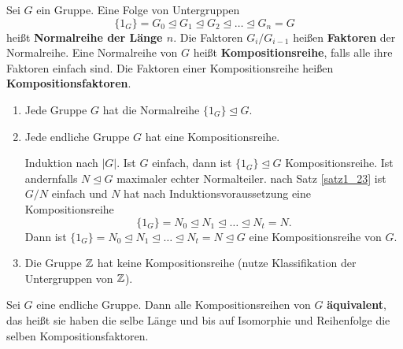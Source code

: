 \begin{definition}
	Sei $G$ ein Gruppe. Eine Folge von Untergruppen
	\[\{1_G\} = G_0 \unlhd G_1 \unlhd G_2 \unlhd \dots \unlhd G_n = G\]
	heißt \textbf{Normalreihe der Länge $n$}. Die Faktoren $G_i/G_{i-1}$ heißen \textbf{Faktoren} der Normalreihe. Eine Normalreihe von $G$ heißt \textbf{Kompositionsreihe}, falls alle ihre Faktoren einfach sind. Die Faktoren einer Kompositionsreihe heißen \textbf{Kompositionsfaktoren}.
\end{definition}
\begin{rem}\label{rem2_15}
	\begin{enumerate}[label=(\roman*)]
		\item Jede Gruppe $G$ hat die Normalreihe $\{1_G\} \unlhd G$.
		\item Jede endliche Gruppe $G$ hat eine Kompositionsreihe.
		
		\begin{inlproof}
			Induktion nach $|G|$. Ist $G$ einfach, dann ist $\{1_G\} \unlhd G$ Kompositionsreihe. Ist andernfalls $N \unlhd G$ maximaler echter Normalteiler. nach Satz \ref{satz1_23} ist $G/N$ einfach und $N$ hat nach Induktionsvoraussetzung eine Kompositionsreihe
			\[\{1_G\} = N_0 \unlhd N_1 \unlhd \dots \unlhd N_t = N.\]
			Dann ist $\{1_G\} = N_0 \unlhd N_1 \unlhd \dots \unlhd N_t = N \unlhd G$ eine Kompositionsreihe von $G$.
		\end{inlproof}
		
		\item Die Gruppe $\mathbb{Z}$ hat keine Kompositionsreihe (nutze Klassifikation der Untergruppen von $\mathbb{Z}$).
	\end{enumerate}
\end{rem}
\begin{thm}\label{Satz von Jordan-Hölder}
	Sei $G$ eine endliche Gruppe. Dann alle Kompositionsreihen von $G$ \textbf{äquivalent}, das heißt sie haben die selbe Länge und bis auf Isomorphie und Reihenfolge die selben Kompositionsfaktoren.
\end{thm}

